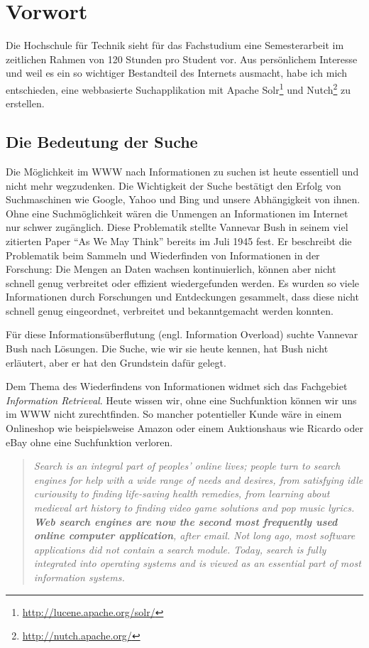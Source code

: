 \cleardoublepage
\chapter{Vorwort}
Die Hochschule für Technik sieht für das Fachstudium eine Semesterarbeit im zeitlichen Rahmen von 120 Stunden pro Student vor.
Aus persönlichem Interesse und weil es ein so wichtiger Bestandteil des Internets ausmacht, habe ich mich entschieden, eine webbasierte Suchapplikation mit Apache Solr\footnote{\url{http://lucene.apache.org/solr/}} und Nutch\footnote{\url{http://nutch.apache.org/}} zu erstellen.

\section{Die Bedeutung der Suche}
Die Möglichkeit im \ac{WWW} nach Informationen zu suchen ist heute essentiell und nicht mehr wegzudenken. Die Wichtigkeit der Suche bestätigt den Erfolg von Suchmaschinen wie Google, Yahoo und Bing und unsere Abhängigkeit von ihnen. Ohne eine Suchmöglichkeit wären die Unmengen an Informationen im Internet nur schwer zugänglich. Diese Problematik stellte Vannevar Bush in seinem viel zitierten Paper “As We May Think” bereits im Juli 1945 fest. Er beschreibt die Problematik beim Sammeln und Wiederfinden von Informationen in der Forschung: Die Mengen an Daten wachsen kontinuierlich, können aber nicht schnell genug verbreitet oder effizient wiedergefunden werden. Es wurden so viele Informationen durch Forschungen und Entdeckungen gesammelt, dass diese nicht schnell genug eingeordnet, verbreitet und bekanntgemacht werden konnten.

Für diese Informationsüberflutung (engl. Information Overload) suchte Vannevar Bush nach Lösungen. Die Suche, wie wir sie heute kennen, hat Bush nicht erläutert, aber er hat den Grundstein dafür gelegt.\cite{VannevarBush19450701}

Dem Thema des Wiederfindens von Informationen widmet sich das Fachgebiet \textit{Information Retrieval}.
Heute wissen wir, ohne eine Suchfunktion können wir uns im WWW nicht zurechtfinden. So mancher potentieller Kunde wäre in einem Onlineshop wie beispielsweise Amazon oder einem Auktionshaus wie Ricardo oder eBay ohne eine Suchfunktion verloren.

\begin{quotation}
\em Search is an integral part of peoples' online lives; people turn to search engines for help with a wide range of needs and desires, from satisfying idle curiousity to finding life-saving health remedies, from learning about medieval art history to finding video game solutions and pop music lyrics. \textbf{Web search engines are now the second most frequently used online computer application}, after email. Not long ago, most software applications did not contain a search module. Today, search is fully integrated into operating systems and is viewed as an essential part of most information systems.\end{quotation}\cite{SUI2009}

